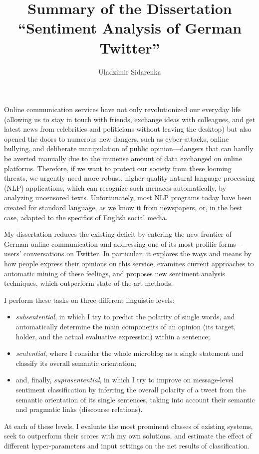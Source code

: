 \documentclass[11pt]{article}
\author{Uladzimir Sidarenka}
\title{  {\large Summary of the Dissertation}\\[0.5em]
  {\Large ``Sentiment Analysis of German Twitter''}}
\date{\vspace{-3ex}}
\begin{document}
\maketitle

Online communication services have not only revolutionized our
everyday life (allowing us to stay in touch with friends, exchange
ideas with colleagues, and get latest news from celebrities and
politicians without leaving the desktop) but also opened the doors to
numerous new dangers, such as cyber-attacks, online bullying, and
deliberate manipulation of public opinion---dangers that can hardly be
averted manually due to the immense amount of data exchanged on online
platforms.  Therefore, if we want to protect our society from these
looming threats, we urgently need more robust, higher-quality natural
language processing (NLP) applications, which can recognize such
menaces automatically, by analyzing uncensored texts.  Unfortunately,
most NLP programs today have been created for standard language, as we
know it from newspapers, or, in the best case, adapted to the
specifics of English social media.

My dissertation reduces the existing deficit by entering the new
frontier of German online communication and addressing one of its most
prolific forms---users' conversations on Twitter.  In particular, it
explores the ways and means by how people express their opinions on
this service, examines current approaches to automatic mining of these
feelings, and proposes new sentiment analysis techniques, which
outperform state-of-the-art methods.

I perform these tasks on three different linguistic levels:
\begin{itemize}
  \item\emph{subsentential}, in which I try to predict the polarity of
    single words, and automatically determine the main components of
    an opinion (its target, holder, and the actual evaluative
    expression) within a sentence;

  \item\emph{sentential}, where I consider the whole microblog as a
    single statement and classify its overall semantic orientation;

  \item and, finally, \emph{suprasentential}, in which I try to
    improve on message-level sentiment classification by inferring the
    overall polarity of a tweet from the semantic orientation of its
    single sentences, taking into account their semantic and pragmatic
    links (discourse relations).
\end{itemize}
At each of these levels, I evaluate the most prominent classes of
existing systems, seek to outperform their scores with my own
solutions, and estimate the effect of different hyper-parameters and
input settings on the net results of classification.
\end{document}
